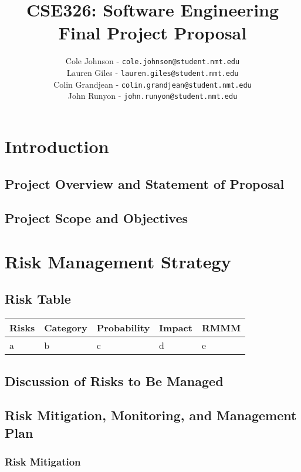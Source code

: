 \documentclass[english,12pt]{article}
\author{
        Cole Johnson - \texttt{cole.johnson@student.nmt.edu} \\
        Lauren Giles - \texttt{lauren.giles@student.nmt.edu} \\
        Colin Grandjean - \texttt{colin.grandjean@student.nmt.edu} \\
        John Runyon  - \texttt{john.runyon@student.nmt.edu}
}
\title{ {\bf CSE326: Software Engineering} \\
        Final Project Proposal
}
\begin{document}
\maketitle
\section{Introduction}
\subsection{Project Overview and Statement of Proposal}
\subsection{Project Scope and Objectives}
\section{Risk Management Strategy}
\subsection{Risk Table}
\begin{table}[H]
  \begin{center}
    \begin{tabular}[c]{|l|l|l|l|l|}
      \hline
      \multicolumn{1}{|c|}{\textbf{Risks}} & 
      \multicolumn{1}{|c|}{\textbf{Category}} & 
      \multicolumn{1}{|c|}{\textbf{Probability}} &
      \multicolumn{1}{|c|}{\textbf{Impact}} &
      \multicolumn{1}{|c|}{\textbf{RMMM}} \\
      \hline
      a & b & c & d & e\\
      \hline
    \end{tabular}
  \end{center}
\end{table}
\subsection{Discussion of Risks to Be Managed}
\subsection{Risk Mitigation, Monitoring, and Management Plan}
\subsubsection{Risk Mitigation}
\end{document}
